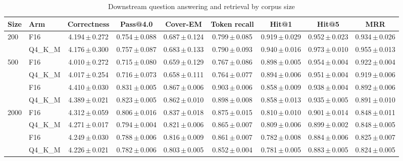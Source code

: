 \begin{table}[t]
\centering
\caption{Downstream question answering and retrieval by corpus size}
\label{tab:qa}
\footnotesize
\setlength{\tabcolsep}{6pt}
\begin{tabular}{llccccccc}
\toprule
\textbf{Size} & \textbf{Arm} & \textbf{Correctness} & \textbf{Pass@4.0} & \textbf{Cover-EM} & \textbf{Token recall} & \textbf{Hit@1} & \textbf{Hit@5} & \textbf{MRR} \\
\midrule
200 & F16 & 4.194\,$\pm$\,0.272 & 0.754\,$\pm$\,0.088 & 0.687\,$\pm$\,0.124 & 0.799\,$\pm$\,0.085 & 0.919\,$\pm$\,0.029 & 0.952\,$\pm$\,0.023 & 0.934\,$\pm$\,0.026 \\
 & Q4\_K\_M & 4.176\,$\pm$\,0.300 & 0.757\,$\pm$\,0.087 & 0.683\,$\pm$\,0.133 & 0.790\,$\pm$\,0.093 & 0.940\,$\pm$\,0.016 & 0.973\,$\pm$\,0.010 & 0.955\,$\pm$\,0.013 \\
\addlinespace[1pt]
\rowcolor{gray!10}500 & F16 & 4.010\,$\pm$\,0.272 & 0.715\,$\pm$\,0.080 & 0.659\,$\pm$\,0.129 & 0.767\,$\pm$\,0.086 & 0.898\,$\pm$\,0.005 & 0.954\,$\pm$\,0.004 & 0.922\,$\pm$\,0.004 \\
\rowcolor{gray!10} & Q4\_K\_M & 4.017\,$\pm$\,0.254 & 0.716\,$\pm$\,0.073 & 0.658\,$\pm$\,0.111 & 0.764\,$\pm$\,0.077 & 0.894\,$\pm$\,0.006 & 0.951\,$\pm$\,0.004 & 0.919\,$\pm$\,0.006 \\
\addlinespace[1pt]
1000 & F16 & 4.410\,$\pm$\,0.030 & 0.831\,$\pm$\,0.005 & 0.867\,$\pm$\,0.006 & 0.903\,$\pm$\,0.006 & 0.858\,$\pm$\,0.009 & 0.938\,$\pm$\,0.004 & 0.892\,$\pm$\,0.006 \\
 & Q4\_K\_M & 4.389\,$\pm$\,0.021 & 0.823\,$\pm$\,0.005 & 0.862\,$\pm$\,0.010 & 0.898\,$\pm$\,0.008 & 0.858\,$\pm$\,0.013 & 0.935\,$\pm$\,0.005 & 0.891\,$\pm$\,0.010 \\
\addlinespace[1pt]
\rowcolor{gray!10}2000 & F16 & 4.312\,$\pm$\,0.059 & 0.806\,$\pm$\,0.016 & 0.837\,$\pm$\,0.018 & 0.875\,$\pm$\,0.015 & 0.810\,$\pm$\,0.010 & 0.901\,$\pm$\,0.014 & 0.848\,$\pm$\,0.011 \\
\rowcolor{gray!10} & Q4\_K\_M & 4.271\,$\pm$\,0.017 & 0.794\,$\pm$\,0.004 & 0.821\,$\pm$\,0.006 & 0.865\,$\pm$\,0.007 & 0.809\,$\pm$\,0.006 & 0.899\,$\pm$\,0.002 & 0.848\,$\pm$\,0.005 \\
\addlinespace[1pt]
3000 & F16 & 4.249\,$\pm$\,0.030 & 0.788\,$\pm$\,0.006 & 0.816\,$\pm$\,0.009 & 0.861\,$\pm$\,0.007 & 0.782\,$\pm$\,0.008 & 0.884\,$\pm$\,0.006 & 0.825\,$\pm$\,0.007 \\
 & Q4\_K\_M & 4.226\,$\pm$\,0.021 & 0.782\,$\pm$\,0.006 & 0.803\,$\pm$\,0.005 & 0.852\,$\pm$\,0.004 & 0.781\,$\pm$\,0.005 & 0.883\,$\pm$\,0.005 & 0.824\,$\pm$\,0.005 \\

\end{tabular}
\end{table}
